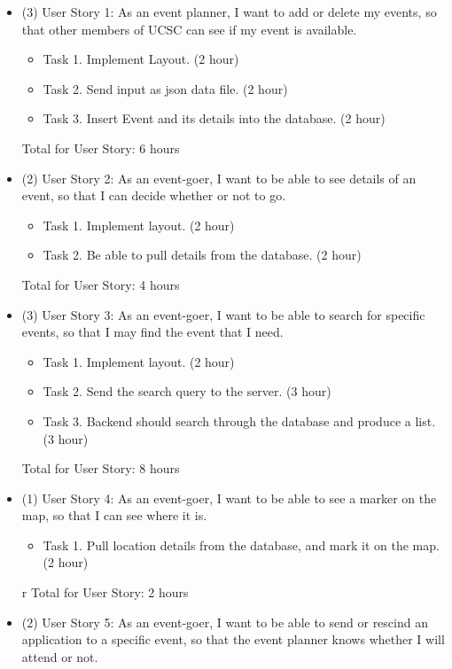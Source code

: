 \documentclass[10pt]{article}
\begin{document}
        \begin{itemize}
            \item (3) User Story 1: As an event planner, I want to add or delete my events, so that other members of UCSC can see if my event is available.

                \begin{itemize}
                    \item Task 1. Implement Layout. (2 hour)
                    \item Task 2. Send input as json data file. (2 hour)
                    \item Task 3. Insert Event and its details into the database. (2 hour)
                \end{itemize}        
                Total for User Story: 6 hours
            \item (2) User Story 2: As an event-goer, I want to be able to see details of an event, so that I can decide whether or not to go.
            
                \begin{itemize}
                    \item Task 1. Implement layout. (2 hour)
		    \item Task 2. Be able to pull details from the database. (2 hour)
                \end{itemize}
                Total for User Story: 4 hours
            \item (3) User Story 3: As an event-goer, I want to be able to search for specific events, so that I may find the event that I need.
            
                \begin{itemize}
                    \item Task 1. Implement layout. (2 hour)
                    \item Task 2. Send the search query to the server. (3 hour)
		    \item Task 3. Backend should search through the database and produce a list. (3 hour)
                \end{itemize}
                Total for User Story: 8 hours
            \item (1) User Story 4: As an event-goer, I want to be able to see a marker on the map, so that I can see where it is.
            
                \begin{itemize}
                    \item Task 1. Pull location details from the database, and mark it on the map. (2 hour)
                \end{itemize}r
                Total for User Story: 2 hours
            \item (2) User Story 5: As an event-goer, I want to be able to send or rescind an application to a specific event, so that the event planner knows whether I will attend or not.
        

\end{itemize}
\end{document}
